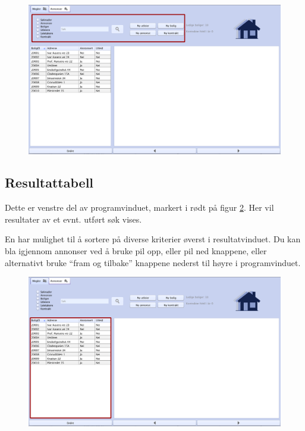 \begin{figure}[h!]
 \includegraphics[width=\textwidth,height=\textheight,keepaspectratio]{./img/brukerveiledning/8.png}
 \caption{}
 \label{fig:bv:8}
\end{figure}


\newpage
\subsection{Resultattabell}

Dette er venstre del av programvinduet, markert i rødt på figur \ref{fig:bv:9}. 
Her vil resultater av et evnt. utført søk vises. 

En har mulighet til å sortere på diverse kriterier øverst i resultatvinduet. Du kan bla igjennom
annonser ved å bruke pil opp, eller pil ned knappene, eller alternativt bruke “fram og tilbake”
knappene nederst til høyre i programvinduet.

\begin{figure}[h!]
 \includegraphics[width=\textwidth,height=\textheight,keepaspectratio]{./img/brukerveiledning/9.png}
 \caption{}
 \label{fig:bv:9}
\end{figure}


